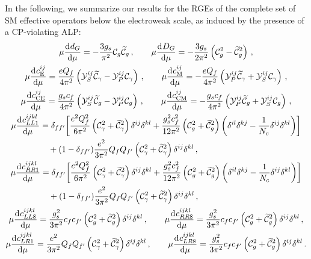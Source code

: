 In the following, we summarize our results for the RGEs of the
complete set of SM effective operators below the electroweak scale, as induced by the presence
of a CP-violating ALP:
\begin{gather}
    \mu \dv[]{d_G}{\mu} = - \frac{3g_s}{\pi^2}\mathcal{C}_g \widetilde{\mathcal{C}}_g\,,
    \qquad
    \mu \dv[]{D_G}{\mu} = -\frac{3g_s}{2\pi^2}\left(\mathcal{C}_g^2 - \widetilde{\mathcal{C}}_g^2\right)\,,
    \\
    \mu\dv[]{c_{\rm E}^{ij}}{\mu} =  \frac{e Q_f}{4 \pi^2} \left( \mathcal{Y}_S^{ij} \widetilde{\mathcal{C}}_\gamma-\mathcal{Y}_P^{ij} \mathcal{C}_\gamma  \right) \,,
    \qquad
    \mu\dv[]{c_{\rm M}^{ij}}{\mu} = - \frac{e Q_f}{4 \pi^2} \left(\mathcal{Y}_P^{ij} \widetilde{\mathcal{C}}_\gamma  + \mathcal{Y}_S^{ij} \mathcal{C}_\gamma\right) \,,
    \\
    \mu\dv[]{c_{\rm CE}^{ij}}{\mu} = \frac{g_s c_f}{4 \pi^2} \left( \mathcal{Y}_S^{ij} \widetilde{\mathcal{C}}_g-\mathcal{Y}_P^{ij} \mathcal{C}_g  \right) \,,
    \qquad
    \mu\dv[]{c_{\rm CM}^{ij}}{\mu} = -\frac{g_s c_f}{4 \pi^2} \left(\mathcal{Y}_P^{ij} \widetilde{\mathcal{C}}_g  + \mathcal{Y}_S^{ij} \mathcal{C}_g\right) \,,\\
    \begin{aligned}
    \mu\dv[]{c_{LL1}^{ijkl}}{\mu} &=  \delta_{ff'}\bigg[\frac{e^2Q_f^2}{6\pi^2}\left(\mathcal C_\gamma^2 + \widetilde{\mathcal C}_\gamma^2\right)\delta^{ij}\delta^{kl}+\frac{g_s^2c_f^2}{12\pi^2}\left(\mathcal C_g^2 + \widetilde{\mathcal C}_g^2\right)\bigg(\delta^{il}\delta^{kj}-\frac{1}{N_c}\delta^{ij}\delta^{kl}\bigg) \bigg] \\&\quad + (1-\delta_{ff'})\frac{e^2}{3\pi^2}Q_f Q_{f'}\left(\mathcal C_\gamma^2 + \widetilde{\mathcal C}_\gamma^2\right)\delta^{ij}\delta^{kl}\,,
    \end{aligned}\\
    \begin{aligned}
    \mu\dv[]{c_{RR1}^{ijkl}}{\mu} &= \delta_{ff'}\bigg[\frac{e^2Q_f^2}{6\pi^2}\left(\mathcal C_\gamma^2 + \widetilde{\mathcal C}_\gamma^2\right)\delta^{ij}\delta^{kl}+\frac{g_s^2c_f^2}{12\pi^2}\left(\mathcal C_g^2 + \widetilde{\mathcal C}_g^2\right)\bigg(\delta^{il}\delta^{kj}-\frac{1}{N_c}\delta^{ij}\delta^{kl}\bigg) \bigg] \\&\quad+ (1-\delta_{ff'})\frac{e^2}{3\pi^2}Q_f Q_{f'}\left(\mathcal C_\gamma^2 + \widetilde{\mathcal C}_\gamma^2\right)\delta^{ij}\delta^{kl}\,,
    \end{aligned}\\
    \mu\dv[]{c_{LL8}^{ijkl}}{\mu} = \frac{g_s^2}{3\pi^2}c_f c_{f'}\left(\mathcal C_g^2 + \widetilde{\mathcal C}_g^2\right)\delta^{ij}\delta^{kl}\,,
    \qquad
    \mu\dv[]{c_{RR8}^{ijkl}}{\mu} = \frac{g_s^2}{3\pi^2}c_f c_{f'}\left(\mathcal C_g^2 + \widetilde{\mathcal C}_g^2\right)\delta^{ij}\delta^{kl}\,,\\
    \mu\dv[]{c_{LR1}^{ijkl}}{\mu} = \frac{e^2}{3\pi^2}Q_f Q_{f'}\left(\mathcal C_\gamma^2 + \widetilde{\mathcal C}_\gamma^2\right)\delta^{ij}\delta^{kl}\,,
    \qquad
    \mu\dv[]{c_{LR8}^{ijkl}}{\mu} = \frac{g_s^2}{3\pi^2}c_f c_{f'}\left(\mathcal C_g^2 + \widetilde{\mathcal C}_g^2\right)\delta^{ij}\delta^{kl}\,.
\end{gather}

